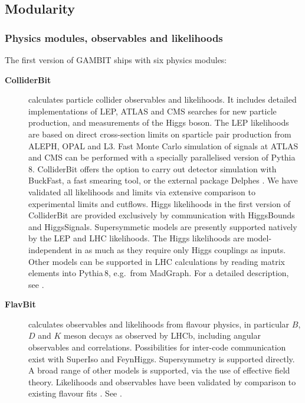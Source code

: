 \documentclass[pdftex,twocolumn,epjc3_preprint,runningheads]{svjour3}
\renewcommand{\_}{\discretionary{\underscore}{}{\underscore}}
\newcommand{\gambit}{\textsf{GAMBIT}\xspace}
\newcommand{\colliderbit}{\textsf{ColliderBit}\xspace}
\newcommand{\flavbit}{\textsf{FlavBit}\xspace}
\newcommand{\GB}{\gambit}
\newcommand{\buckfast}{\textsf{BuckFast}\xspace}
\newcommand{\pythiaeight}{\textsf{Pythia\,8}\xspace}
\newcommand{\madgraph}{\textsf{MadGraph}\xspace}
\newcommand{\higgsbounds}{\textsf{HiggsBounds}\xspace}
\newcommand{\higgssignals}{\textsf{HiggsSignals}\xspace}
\newcommand{\feynhiggs}{\textsf{FeynHiggs}\xspace}
\newcommand{\FH}{\feynhiggs}
\newcommand\superiso{\textsf{SuperIso}\xspace}
\begin{document}
\subsection{Modularity}

\subsubsection{Physics modules, observables and likelihoods}

The first version of \GB ships with six physics modules:

\begin{description}
\item[\textbf{\colliderbit}\!]calculates particle collider observables and likelihoods.  It includes detailed implementations of LEP, ATLAS and CMS searches for new particle production, and measurements of the Higgs boson.  The LEP likelihoods are based on direct cross-section limits on sparticle pair production from ALEPH, OPAL and L3.  Fast Monte Carlo simulation of signals at ATLAS and CMS can be performed with a specially parallelised version of \pythiaeight \cite{Sjostrand:2014zea}.  \colliderbit offers the option to carry out detector simulation with \buckfast, a fast smearing tool, or the external package \textsf{Delphes} \cite{Ovyn:2009tx,deFavereau:2013fsa}.  We have validated all likelihoods and limits via extensive comparison to experimental limits and cutflows.  Higgs likelihoods in the first version of \colliderbit are provided exclusively by communication with \higgsbounds \cite{Bechtle:2008jh,Bechtle:2011sb,Bechtle:2013wla} and \higgssignals \cite{HiggsSignals}. Supersymmetic models are presently supported natively by the LEP and LHC likelihoods.  The Higgs likelihoods are model-independent in as much as they require only Higgs couplings as inputs.  Other models can be supported in LHC calculations by reading matrix elements into \pythiaeight, e.g.\ from \madgraph \cite{Alwall:2011uj,Alwall:2014hca}.  For a detailed description, see \cite{ColliderBit}.
\item[\textbf{\flavbit}\!]calculates observables and likelihoods from flavour physics, in particular $B$, $D$ and $K$ meson decays as observed by LHCb, including angular observables and correlations.  Possibilities for inter-code communication exist with \superiso \cite{Mahmoudi:2007vz,Mahmoudi:2008tp,Mahmoudi:2009zz} and \FH \cite{Bahl:2017aev,Bahl:2016brp,Hahn:2013ria,Frank:2006yh,Degrassi:2002fi,Heinemeyer:1998np,Heinemeyer:1998yj}.  Supersymmetry is supported directly.  A broad range of other models is supported, via the use of effective field theory. Likelihoods and observables have been validated by comparison to existing flavour fits \cite{Mahmoudi:2014mja,Altmannshofer:2013foa,Descotes-Genon:2015uva}.  See \cite{FlavBit}.

\end{description}
\end{document}
